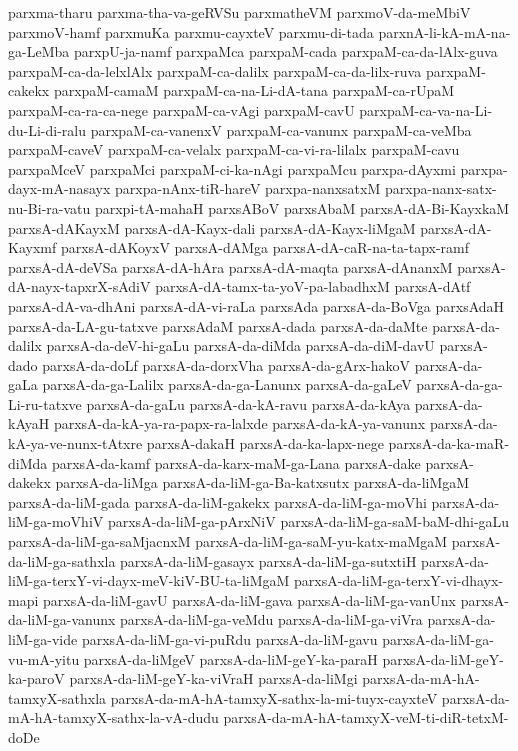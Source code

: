 {parxma-tharu
parxma-tha-va-geRVSu
parxmatheVM
parxmoV-da-meMbiV
parxmoV-hamf
parxmuKa
parxmu-cayxteV
parxmu-di-tada
parxnA-li-kA-mA-na-ga-LeMba
parxpU-ja-namf
parxpaMca
parxpaM-cada
parxpaM-ca-da-lAlx-guva
parxpaM-ca-da-lelxlAlx
parxpaM-ca-dalilx
parxpaM-ca-da-lilx-ruva
parxpaM-cakekx
parxpaM-camaM
parxpaM-ca-na-Li-dA-tana
parxpaM-ca-rUpaM
parxpaM-ca-ra-ca-nege
parxpaM-ca-vAgi
parxpaM-cavU
parxpaM-ca-va-na-Li-du-Li-di-ralu
parxpaM-ca-vanenxV
parxpaM-ca-vanunx
parxpaM-ca-veMba
parxpaM-caveV
parxpaM-ca-velalx
parxpaM-ca-vi-ra-lilalx
parxpaM-cavu
parxpaMceV
parxpaMci
parxpaM-ci-ka-nAgi
parxpaMcu
parxpa-dAyxmi
parxpa-dayx-mA-nasayx
parxpa-nAnx-tiR-hareV
parxpa-nanxsatxM
parxpa-nanx-satx-nu-Bi-ra-vatu
parxpi-tA-mahaH
parxsABoV
parxsAbaM
parxsA-dA-Bi-KayxkaM
parxsA-dAKayxM
parxsA-dA-Kayx-dali
parxsA-dA-Kayx-liMgaM
parxsA-dA-Kayxmf
parxsA-dAKoyxV
parxsA-dAMga
parxsA-dA-caR-na-ta-tapx-ramf
parxsA-dA-deVSa
parxsA-dA-hAra
parxsA-dA-maqta
parxsA-dAnanxM
parxsA-dA-nayx-tapxrX-sAdiV
parxsA-dA-tamx-ta-yoV-pa-labadhxM
parxsA-dAtf
parxsA-dA-va-dhAni
parxsA-dA-vi-raLa
parxsAda
parxsA-da-BoVga
parxsAdaH
parxsA-da-LA-gu-tatxve
parxsAdaM
parxsA-dada
parxsA-da-daMte
parxsA-da-dalilx
parxsA-da-deV-hi-gaLu
parxsA-da-diMda
parxsA-da-diM-davU
parxsA-dado
parxsA-da-doLf
parxsA-da-dorxVha
parxsA-da-gArx-hakoV
parxsA-da-gaLa
parxsA-da-ga-Lalilx
parxsA-da-ga-Lanunx
parxsA-da-gaLeV
parxsA-da-ga-Li-ru-tatxve
parxsA-da-gaLu
parxsA-da-kA-ravu
parxsA-da-kAya
parxsA-da-kAyaH
parxsA-da-kA-ya-ra-papx-ra-lalxde
parxsA-da-kA-ya-vanunx
parxsA-da-kA-ya-ve-nunx-tAtxre
parxsA-dakaH
parxsA-da-ka-lapx-nege
parxsA-da-ka-maR-diMda
parxsA-da-kamf
parxsA-da-karx-maM-ga-Lana
parxsA-dake
parxsA-dakekx
parxsA-da-liMga
parxsA-da-liM-ga-Ba-katxsutx
parxsA-da-liMgaM
parxsA-da-liM-gada
parxsA-da-liM-gakekx
parxsA-da-liM-ga-moVhi
parxsA-da-liM-ga-moVhiV
parxsA-da-liM-ga-pArxNiV
parxsA-da-liM-ga-saM-baM-dhi-gaLu
parxsA-da-liM-ga-saMjacnxM
parxsA-da-liM-ga-saM-yu-katx-maMgaM
parxsA-da-liM-ga-sathxla
parxsA-da-liM-gasayx
parxsA-da-liM-ga-sutxtiH
parxsA-da-liM-ga-terxY-vi-dayx-meV-kiV-BU-ta-liMgaM
parxsA-da-liM-ga-terxY-vi-dhayx-mapi
parxsA-da-liM-gavU
parxsA-da-liM-gava
parxsA-da-liM-ga-vanUnx
parxsA-da-liM-ga-vanunx
parxsA-da-liM-ga-veMdu
parxsA-da-liM-ga-viVra
parxsA-da-liM-ga-vide
parxsA-da-liM-ga-vi-puRdu
parxsA-da-liM-gavu
parxsA-da-liM-ga-vu-mA-yitu
parxsA-da-liMgeV
parxsA-da-liM-geY-ka-paraH
parxsA-da-liM-geY-ka-paroV
parxsA-da-liM-geY-ka-viVraH
parxsA-da-liMgi
parxsA-da-mA-hA-tamxyX-sathxla
parxsA-da-mA-hA-tamxyX-sathx-la-mi-tuyx-cayxteV
parxsA-da-mA-hA-tamxyX-sathx-la-vA-dudu
parxsA-da-mA-hA-tamxyX-veM-ti-diR-tetxM-doDe
}
